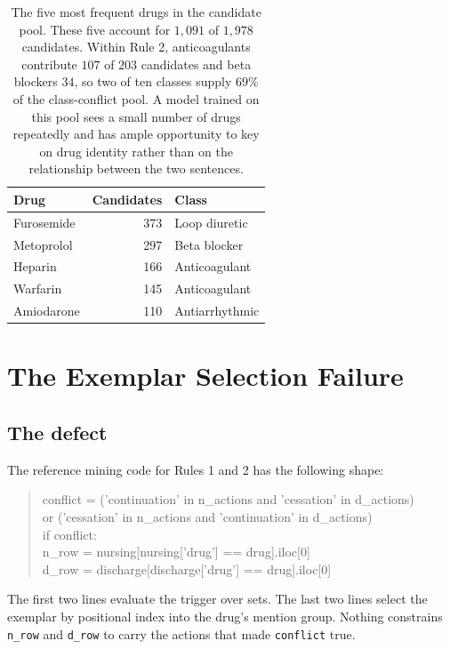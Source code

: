 \begin{table}[t]
\centering
\small
\begin{tabular}{lrl}
\toprule
\textbf{Drug} & \textbf{Candidates} & \textbf{Class} \\
\midrule
Furosemide  & 373 & Loop diuretic \\
Metoprolol  & 297 & Beta blocker \\
Heparin     & 166 & Anticoagulant \\
Warfarin    & 145 & Anticoagulant \\
Amiodarone  & 110 & Antiarrhythmic \\
\bottomrule
\end{tabular}
\caption{The five most frequent drugs in the candidate pool. These five account
for $1{,}091$ of $1{,}978$ candidates. Within Rule 2, anticoagulants contribute
$107$ of $203$ candidates and beta blockers $34$, so two of ten classes supply
$69\%$ of the class-conflict pool. A model trained on this pool sees a small
number of drugs repeatedly and has ample opportunity to key on drug identity
rather than on the relationship between the two sentences.}
\label{tab:top-drugs}
\end{table}

\section{The Exemplar Selection Failure}
\label{sec:exemplar}

\subsection{The defect}

The reference mining code for Rules 1 and 2 has the following shape:

\begin{quote}\ttfamily\small
conflict = ('continuation' in n\_actions and 'cessation' in d\_actions) \\
\hphantom{conflict = }or ('cessation' in n\_actions and 'continuation' in d\_actions) \\
if conflict: \\
\hphantom{if }n\_row = nursing[nursing['drug'] == drug].iloc[0] \\
\hphantom{if }d\_row = discharge[discharge['drug'] == drug].iloc[0]
\end{quote}

The first two lines evaluate the trigger over sets. The last two lines select
the exemplar by positional index into the drug's mention group. Nothing
constrains \texttt{n\_row} and \texttt{d\_row} to carry the actions that made
\texttt{conflict} true.

